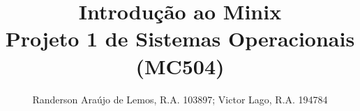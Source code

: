 %
%






\documentclass[journal]{IEEEtran}

\usepackage{xcolor,soul,framed} %

\usepackage[pdftex]{graphicx}
\graphicspath{{../pdf/}{../jpeg/}}

\usepackage[cmex10]{amsmath}
\usepackage{array}
\usepackage{mdwmath}
\usepackage{mdwtab}
\usepackage{eqparbox}
\usepackage{url}

\usepackage{listings}





  \title{Introdução ao Minix\\ \large{Projeto 1 de Sistemas Operacionais (MC504)}  
  }
  \author{Randerson Araújo de Lemos, R.A. 103897;
      Victor Lago, R.A. 194784%
      
  
}  


